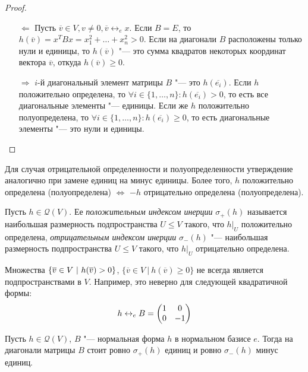 \begin{proof}~
	\begin{itemize}
		\item[$\Leftarrow$] Пусть $\overline{v} \in V, v \ne 0, \overline{v} \leftrightarrow_e x$. Если $B = E$, то $h(\overline{v}) = x^TBx = x_1^2 + \dots + x_n^2 > 0$. Если на диагонали $B$ расположены только нули и единицы, то $h(\overline{v})$ "--- это сумма квадратов некоторых координат вектора $\overline{v}$, откуда $h(\overline{v}) \ge 0$.
		
		\item[$\Rightarrow$] $i$-й диагональный элемент матрицы $B$ "--- это $h(\overline{e_i})$. Если $h$ положительно определена, то $\forall i \in \{1, \dots, n\}: h(\overline{e_i}) > 0$, то есть все диагональные элементы "--- единицы. Если же $h$ положительно полуопределена, то $\forall i \in \{1, \dots, n\}: h(\overline{e_i}) \ge 0$, то есть диагональные элементы "--- это нули и единицы.\qedhere
	\end{itemize}
\end{proof}

\begin{note}
	Для случая отрицательной определенности и полуопределенности утверждение аналогично при замене единиц на минус единицы. Более того, $h$ положительно определена (полуопределена) $\Leftrightarrow$ $-h$ отрицательно определена (полуопределена).
\end{note}

\begin{definition}
	Пусть $h \in \mathcal{Q}(V)$. Ее \textit{положительным индексом инерции} $\sigma_+(h)$ называется наибольшая размерность подпространства $U \le V$ такого, что $h|_U$ положительно определена, \textit{отрицательным индексом инерции} $\sigma_-(h)$ "--- наибольшая размерность подпространства $U \le V$ такого, что $h|_U$ отрицательно определена.
\end{definition}

\begin{note}
	Множества $\{\overline{v} \in V~|~h(\overline{v}) \hm{>} 0\}$, $\{\overline{v} \in V~|~h(\overline{v}) \ge 0\}$ не всегда является подпространствами в $V$. Например, это неверно для следующей квадратичной формы:
	\[h \leftrightarrow_e B \hm{=} \begin{pmatrix}1&0\\0&-1\end{pmatrix}\]
\end{note}

\begin{theorem}
	Пусть $h \in \mathcal{Q}(V)$, $B$ "--- нормальная форма $h$ в нормальном базисе $e$. Тогда на диагонали матрицы $B$ стоит ровно $\sigma_+(h)$ единиц и ровно $\sigma_-(h)$ минус единиц.
\end{theorem}

